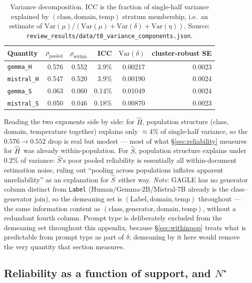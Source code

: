 \documentclass{article}
\newcommand{\Sest}{\ensuremath{\widehat{S}}}
\newcommand{\Hest}{\ensuremath{\widehat{H}}}
\begin{document}
\begin{table}[h]
\centering
\footnotesize
\caption{Variance decomposition. ICC is the fraction of single-half variance
explained by $(\text{class},\text{domain},\text{temp})$ stratum membership,
i.e.\ an estimate of $\mathrm{Var}(\mu)/(\mathrm{Var}(\mu)+\mathrm{Var}(\delta)+\mathrm{Var}(\eta))$.
Source: \texttt{review\_results/data/t0\_variance\_components.json}.}
\label{tab:variancecomponents}
\begin{tabular}{lrrrrr}
\toprule
Quantity & $\rho_{\text{pooled}}$ & $\rho_{\text{within}}$ & ICC & $\mathrm{Var}(\delta)$ & cluster-robust SE \\
\midrule
\texttt{gemma\_H}   & 0.576 & 0.552 & 3.9\%  & 0.00217 & 0.0023 \\
\texttt{mistral\_H} & 0.547 & 0.520 & 3.9\%  & 0.00190 & 0.0024 \\
\texttt{gemma\_S}   & 0.063 & 0.060 & 0.14\% & 0.01049 & 0.0024 \\
\texttt{mistral\_S} & 0.050 & 0.046 & 0.18\% & 0.00870 & 0.0023 \\
\bottomrule
\end{tabular}
\end{table}

Reading the two exponents side by side: for \Hest, population structure
(class, domain, temperature together) explains only $\approx\!4\%$ of
single-half variance, so the $0.576\to0.552$ drop is real but modest --- most
of what \S\ref{sec:reliability} measures for \Hest\ was already
within-population. For \Sest, population structure explains under $0.2\%$ of
variance: \Sest's poor pooled reliability is essentially all within-document
estimation noise, ruling out ``pooling across populations inflates apparent
unreliability'' as an explanation for \Sest\ either way. \emph{Note}: GAGLE has
no generator column distinct from \texttt{Label} (Human/Gemma-2B/Mistral-7B
already is the class--generator join), so the demeaning set is
$(\text{Label},\text{domain},\text{temp})$ throughout --- the same information
content as $(\text{class},\text{generator},\text{domain},\text{temp})$, without
a redundant fourth column. Prompt type is deliberately excluded from the
demeaning set throughout this appendix, because \S\ref{sec:withinpop} treats
what is predictable from prompt type as part of $\delta$; demeaning by it here
would remove the very quantity that section measures.

\subsection{Reliability as a function of support, and $N^{\star}$}
\label{app:nstar}
\end{document}

